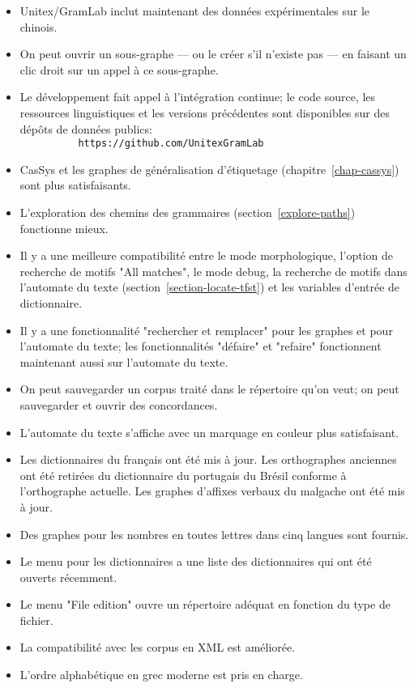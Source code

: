 \begin{itemize}
  \item Unitex/GramLab inclut maintenant des données expérimentales sur le chinois.
  \item On peut ouvrir un sous-graphe --- ou le créer s'il n'existe pas --- en faisant un clic droit sur un
  appel à ce sous-graphe.
  \item Le développement fait appel à l'intégration continue; le code source, les ressources
  linguistiques et les versions précédentes sont disponibles sur des dépôts de données publics:\\
  \verb$          https://github.com/UnitexGramLab$
  \item CasSys et les graphes de généralisation d'étiquetage (chapitre~\ref{chap-cassys}) sont plus
  satisfaisants.
  \item L'exploration des chemins des grammaires (section~\ref{explore-paths}) fonctionne mieux.
  \item Il y a une meilleure compatibilité entre le mode morphologique, l'option de recherche de motifs
  "All matches",   le mode debug, la recherche de motifs dans l'automate du texte
  (section~\ref{section-locate-tfst}) et les variables d'entrée de dictionnaire.
  \item Il y a une fonctionnalité "rechercher et remplacer" pour les graphes et pour l'automate du texte;
  les fonctionnalités "défaire" et "refaire" fonctionnent maintenant aussi sur l'automate du texte.
  \item On peut sauvegarder un corpus traité dans le répertoire qu'on veut; on peut sauvegarder
  et ouvrir des concordances.
  \item L'automate du texte s'affiche avec un marquage en couleur plus satisfaisant.
  \item Les dictionnaires du français ont été mis à jour. Les orthographes anciennes ont été retirées du
  dictionnaire du portugais du Brésil conforme à l'orthographe actuelle. Les graphes d'affixes verbaux
  du malgache ont été mis à jour.
  \item Des graphes pour les nombres en toutes lettres dans cinq langues sont fournis.
  \item Le menu pour les dictionnaires a une liste des dictionnaires qui ont été ouverts récemment.
  \item Le menu "File edition" ouvre un répertoire adéquat en fonction du type de fichier.
  \item La compatibilité avec les corpus en XML est améliorée.
  \item L'ordre alphabétique en grec moderne est pris en charge.

\end{itemize}
